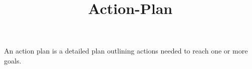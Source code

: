 \documentclass[a4paper]{article}
\title{Action-Plan}
\date{}
\begin{document}
\maketitle
    An action plan is a detailed plan outlining actions needed to reach one or more goals. 
\end{document}
